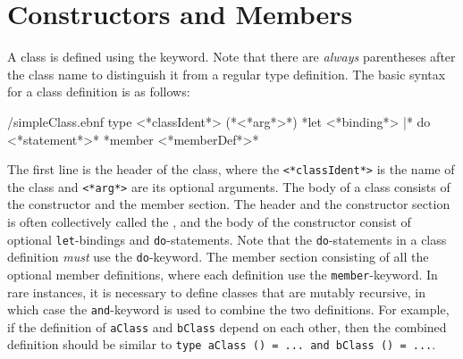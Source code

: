 \section{Constructors and Members}
\label{sec:constructor}
A class is defined using the  keyword. Note that there are \emph{always} parentheses after the class name to distinguish it from a regular type definition. The basic syntax for a class definition is as follows:%
%
\begin{verbatimwrite}{\ebnf/simpleClass.ebnf}
type <*classIdent*> ({*<*arg*>*})
  {*let <*binding*> |* do <*statement*>*}
  {*member <*memberDef*>*}
\end{verbatimwrite}
%
The first line is the header of the class, where the \lstinline[language=syntax]{<*classIdent*>} is the name of the class and \lstinline[language=syntax]{<*arg*>} are its optional arguments. The body of a class consists of the constructor and the member section. The header and the constructor section is often collectively called the , and the body of the constructor consist of optional \lstinline{let}-bindings and \lstinline{do}-statements. Note that the \lstinline{do}-statements in a class definition \emph{must} use the \lstinline{do}-keyword. The member section consisting of all the optional member definitions, where each definition use the \lstinline{member}-keyword. In rare instances, it is necessary to define classes that are mutably recursive, in which case the \lstinline{and}-keyword is used to combine the two definitions. For example, if the definition of \lstinline{aClass} and \lstinline{bClass} depend on each other, then the combined definition should be similar to \lstinline{type aClass () = ... and bClass () = ...}.


